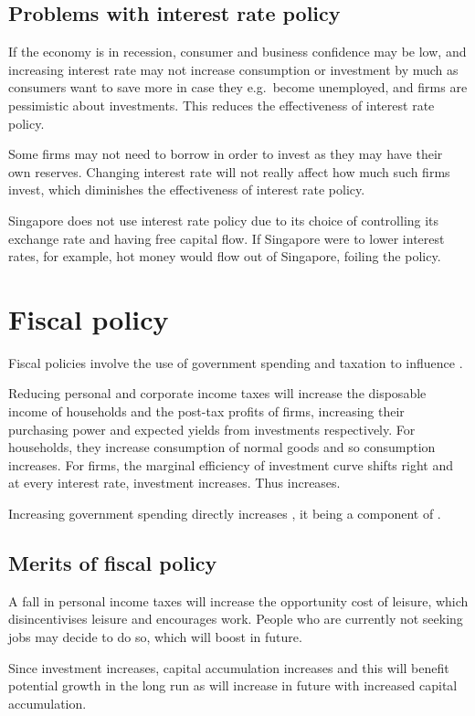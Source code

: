 \documentclass[Economics.tex]{subfiles}
\begin{document}
\subsection{Problems with interest rate policy}
If the economy is in recession, consumer and business confidence may be low, and increasing interest rate may not increase consumption or investment by much as consumers want to save more in case they e.g.\ become unemployed, and firms are pessimistic about investments. This reduces the effectiveness of interest rate policy.

Some firms may not need to borrow in order to invest as they may have their own reserves. Changing interest rate will not really affect how much such firms invest, which diminishes the effectiveness of interest rate policy.

Singapore does not use interest rate policy due to its choice of controlling its exchange rate and having free capital flow. If Singapore were to lower interest rates, for example, hot money would flow out of Singapore, foiling the policy.
\section{Fiscal policy}
Fiscal policies involve the use of government spending and taxation to influence \AD{}.

Reducing personal and corporate income taxes will increase the disposable income of households and the post-tax profits of firms, increasing their purchasing power and expected yields from investments respectively. For households, they increase consumption of normal goods and so consumption increases. For firms, the marginal efficiency of investment curve shifts right and at every interest rate, investment increases. Thus \AD{} increases.

Increasing government spending directly increases \AD{}, it being a component of \AD{}.
\subsection{Merits of fiscal policy}
A fall in personal income taxes will increase the opportunity cost of leisure, which disincentivises leisure and encourages work. People who are currently not seeking jobs may decide to do so, which will boost \AS{} in future.

Since investment increases, capital accumulation increases and this will benefit potential growth in the long run as \AS{} will increase in future with increased capital accumulation.
\end{document}
